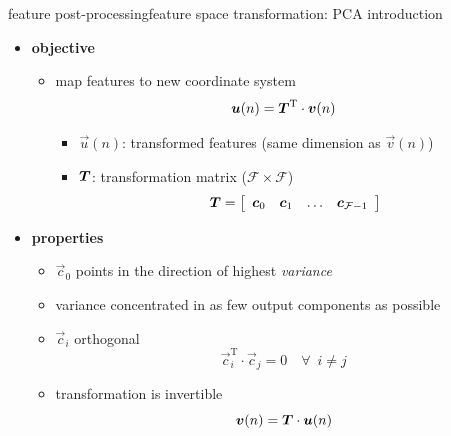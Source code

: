 		\begin{frame}{feature post-processing}{feature space transformation: PCA introduction}
            \begin{itemize}
                \item   \textbf{objective}
                    \begin{itemize}
                        \item   map features to new coordinate system
                            \begin{equation*}\label{eq:pca_an}
                                \vec{u}(n) = \mat{T}^\mathrm{T}\cdot\vec{v}(n) 
                            \end{equation*}
                            \begin{itemize}
                                \item   $\vec{u}(n)$: transformed features (same dimension as $\vec{v}(n)$)
                                \item   $\mat{T}$: transformation matrix ($\mathcal{F}\times\mathcal{F}$)	
                                    \begin{equation*}
                                        \mat{T} =   \left[ 
                                                        \begin{array}{cccc}
                                                        \vec{c}_0 & \vec{c}_1 & \ldots & \vec{c}_{\mathcal{F}-1}\\
                                                        \end{array}  
                                                    \right] 
                                    \end{equation*}
                            \end{itemize}
                    \end{itemize}
                \item<2->   \textbf{properties}
                    \begin{itemize}
                        \item	$\vec{c}_0$ points in the direction of  highest \emph{variance}
                        \item<3->	variance concentrated in as few output components as possible
                        \item<4->	$\vec{c}_i$ orthogonal
                                \begin{equation*}
                                    \vec{c}_i^\mathrm{T}\cdot \vec{c}_j = 0\quad \forall\enspace i \neq j
                                \end{equation*}
                        \item<5->	transformation is invertible
                                \begin{equation*}\label{eq:pca_syn}
                                    \vec{v}(n) = \mat{T}\cdot\vec{u}(n)
                                \end{equation*}
                    \end{itemize}
            \end{itemize}
		\end{frame}
